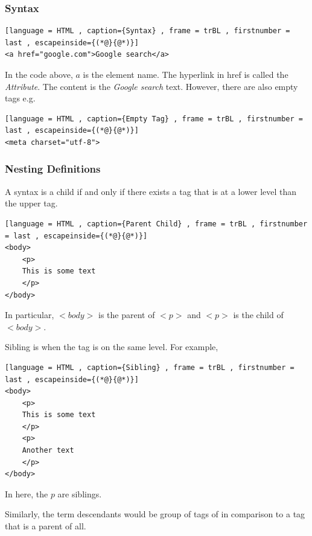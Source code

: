 \documentclass[a4paper]{article}
\theoremstyle{plain}
\theoremstyle{definition}
\newtheorem{defn}{Definition}[section]
\theoremstyle{remark}
\begin{document}
\subsubsection{Syntax}
\begin{lstlisting}[language = HTML , caption={Syntax} , frame = trBL , firstnumber = last , escapeinside={(*@}{@*)}]
<a href="google.com">Google search</a>
\end{lstlisting}
In the code above, $a$ is the element name. The hyperlink in href is called the \textit{Attribute}. The content is the \textit{Google search} text.
However, there are also empty tags e.g.
 \begin{lstlisting}[language = HTML , caption={Empty Tag} , frame = trBL , firstnumber = last , escapeinside={(*@}{@*)}]
<meta charset="utf-8">
\end{lstlisting}
\subsubsection{Nesting Definitions}
\begin{tcolorbox}[colback=black!3!white,colframe=black!60!white,title=\begin{defn}Child and parent \label{Child}\end{defn}]
A syntax is a child if and only if there exists a tag that is at a lower level than the upper tag.
\begin{lstlisting}[language = HTML , caption={Parent Child} , frame = trBL , firstnumber = last , escapeinside={(*@}{@*)}]
<body>
	<p>
	This is some text
	</p>
</body>
\end{lstlisting}
In particular, $<body>$ is the parent of $<p>$ and $<p>$ is the child of $<body>$.
\end{tcolorbox}
\begin{tcolorbox}[colback=black!3!white,colframe=black!60!white,title=\begin{defn}Sibling \label{Sibling}\end{defn}]
Sibling is when the tag is on the same level. For example,
\begin{lstlisting}[language = HTML , caption={Sibling} , frame = trBL , firstnumber = last , escapeinside={(*@}{@*)}]
<body>
	<p>
	This is some text
	</p>
	<p>
	Another text
	</p>
</body>
\end{lstlisting}
In here, the $p$ are siblings.
\end{tcolorbox}
Similarly, the term descendants would be group of tags of in comparison to a tag that is a parent of all.
\end{document}
